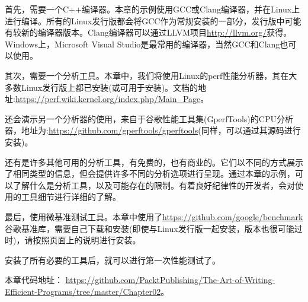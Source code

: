首先，需要一个C++编译器。本章的示例使用GCC或Clang编译器，并在Linux上进行编译。所有的Linux发行版都会将GCC作为常规安装的一部分，发行版中可能有较新的编译器版本。Clang编译器可以通过LLVM项目\url{http://llvm.org/}获得。Windows上，Microsoft Visual Studio是最常用的编译器，当然GCC和Clang也可以使用。

其次，需要一个分析工具。本章中，我们将使用Linux的perf性能分析器，其在大多数Linux发行版上都已安装(或可用于安装)。文档的地址:\url{https://perf.wiki.kernel.org/index.php/Main_Page}。

还会演示另一个分析器的使用，来自于谷歌性能工具集(GperfTools)的CPU分析器，地址为:\url{https://github.com/gperftools/gperftools}(同样，可以通过其源码进行安装)。

还有是许多其他可用的分析工具，有免费的，也有商业的。它们以不同的方式展示了相同类型的信息，但会提供许多不同的分析选项进行呈现。通过本章的示例，可以了解什么是分析工具，以及可能存在的限制。有着良好纪律性的开发者，会对使用的工具细节进行详细的了解。

最后，使用微基准测试工具。本章中使用了\url{https://github.com/google/benchmark}谷歌基准库，需要自己下载和安装(即使与Linux发行版一起安装，版本也很可能过时)，请按照页面上的说明进行安装。

安装了所有必要的工具后，就可以进行第一次性能测试了。

本章代码地址： \url{https://github.com/PacktPublishing/The-Art-of-Writing-Efficient-Programs/tree/master/Chapter02}。



